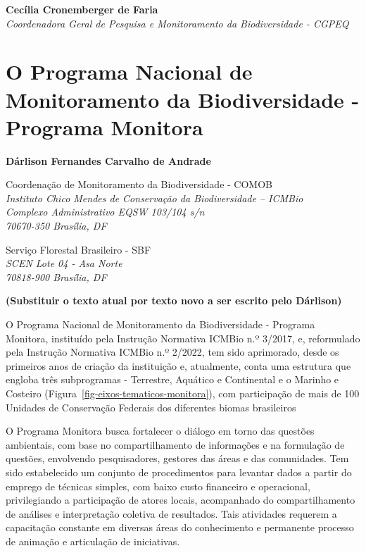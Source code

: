 \documentclass[
  letterpaper,
]{scrbook}
\begin{document}
\textbf{Cecília Cronemberger de Faria}\\
\emph{Coordenadora Geral de Pesquisa e Monitoramento da Biodiversidade -
CGPEQ}~


\chapter{O Programa Nacional de Monitoramento da Biodiversidade -
Programa Monitora}\label{cap1}

\textbf{Dárlison Fernandes Carvalho de Andrade}

Coordenação de Monitoramento da Biodiversidade - COMOB\\
\emph{Instituto Chico Mendes de Conservação da Biodiversidade --
ICMBio}\\
\emph{Complexo Administrativo EQSW 103/104 s/n}\\
\emph{70670-350 Brasília, DF}

Serviço Florestal Brasileiro - SBF\\
\emph{SCEN Lote 04 - Asa Norte}\\
\emph{70818-900 Brasília, DF}

\textbf{(Substituir o texto atual por texto novo a ser escrito pelo
Dárlison)}

O Programa Nacional de Monitoramento da Biodiversidade - Programa
Monitora, instituído pela Instrução Normativa ICMBio n.º 3/2017, e,
reformulado pela Instrução Normativa ICMBio n.º 2/2022, tem sido
aprimorado, desde os primeiros anos de criação da instituição e,
atualmente, conta uma estrutura que engloba três subprogramas -
Terrestre, Aquático e Continental e o Marinho e Costeiro
(Figura~\ref{fig-eixos-tematicos-monitora}), com participação de mais de
100 Unidades de Conservação Federais dos diferentes biomas brasileiros

O Programa Monitora busca fortalecer o diálogo em torno das questões
ambientais, com base no compartilhamento de informações e na formulação
de questões, envolvendo pesquisadores, gestores das áreas e das
comunidades. Tem sido estabelecido um conjunto de procedimentos para
levantar dados a partir do emprego de técnicas simples, com baixo custo
financeiro e operacional, privilegiando a participação de atores locais,
acompanhado do compartilhamento de análises e interpretação coletiva de
resultados. Tais atividades requerem a capacitação constante em diversas
áreas do conhecimento e permanente processo de animação e articulação de
iniciativas.
\end{document}
